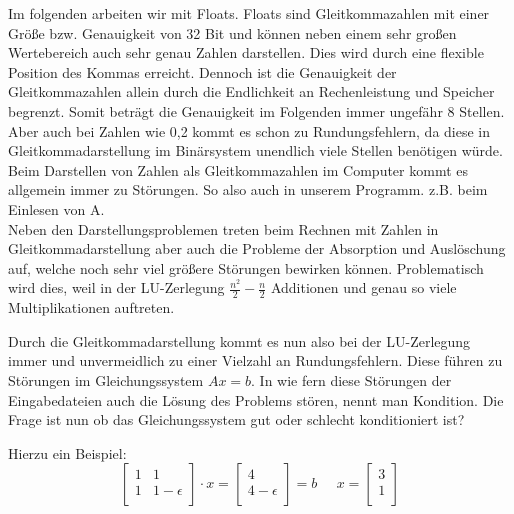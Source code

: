 \documentclass[course=erap]{aspdoc}
\begin{document}
Im folgenden arbeiten wir mit Floats. Floats sind Gleitkommazahlen mit einer Größe 
bzw. Genauigkeit von 32 Bit und können neben einem sehr großen Wertebereich auch 
sehr genau Zahlen darstellen. Dies wird durch eine flexible Position des Kommas erreicht. 
Dennoch ist die Genauigkeit der Gleitkommazahlen allein durch die Endlichkeit an 
Rechenleistung und Speicher begrenzt. Somit beträgt die 
Genauigkeit im Folgenden immer ungefähr 8 Stellen. Aber auch bei Zahlen wie 
0,2 kommt es schon zu Rundungsfehlern, da diese in Gleitkommadarstellung im Binärsystem unendlich 
viele Stellen benötigen würde. Beim Darstellen von Zahlen als Gleitkommazahlen im Computer 
kommt es allgemein immer zu Störungen. So also auch in unserem Programm. z.B. beim Einlesen von A.\\
Neben den Darstellungsproblemen treten beim Rechnen mit Zahlen in Gleitkommadarstellung aber auch 
die Probleme der Absorption und Auslöschung auf, welche noch sehr viel größere Störungen bewirken können. 
Problematisch wird dies, weil in der LU-Zerlegung $\frac{n^2}{2} - \frac{n}{2} $
Additionen und genau so viele Multiplikationen auftreten\cite{LUGenauigkeit}. 

Durch die Gleitkommadarstellung kommt es nun also bei der LU-Zerlegung immer und 
unvermeidlich zu einer Vielzahl an Rundungsfehlern. Diese führen zu Störungen im Gleichungssystem $Ax=b$. 
In wie fern diese Störungen der Eingabedateien auch die Lösung des Problems stören, nennt man Kondition. 
Die Frage ist nun ob das Gleichungssystem gut oder schlecht konditioniert ist?

Hierzu ein Beispiel:
  \begin{equation}
    \label{absBeis}
    \begin{bmatrix}
    1	& 1	 \\
    1	& 1-\epsilon\\
    \end{bmatrix}
    \cdot x = 
    \begin{bmatrix}
    4 \\
    4- \epsilon\\
    \end{bmatrix}
    = b\;\;\;\;\;
    x = 
    \begin{bmatrix}
    3 \\
    1\\
    \end{bmatrix}
  \end{equation}
\end{document}

